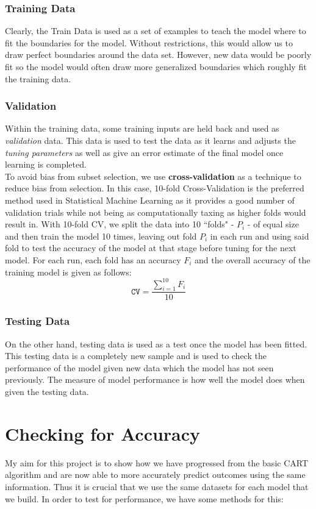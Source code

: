 \documentclass[11pt,a4paper]{report}
\begin{document}
\subsubsection{Training Data}
Clearly, the Train Data is used as a set of examples to teach the model where to fit the boundaries for the model. 
Without restrictions, this would allow us to draw perfect boundaries around the data set. However, new data would be poorly fit so the model would often draw more generalized boundaries which roughly fit the training data.
\subsubsection{Validation}
Within the training data, some training inputs are held back and used as \textit{validation} data.
This data is used to test the data as it learns and adjusts the \textit{tuning parameters} as well as give an error estimate of the final model once learning is completed.
\medskip\\
To avoid bias from subset selection, we use \textbf{cross-validation} as a technique to reduce bias from selection.
In this case, 10-fold Cross-Validation is the preferred method used in Statistical Machine Learning as it provides a good number of validation trials while not being as computationally taxing as higher folds would result in.
With 10-fold CV, we split the data into 10 ``folds" - $P_i$ - of equal size and then train the model 10 times, leaving out fold $P_i$ in each run and using said fold to test the accuracy of the model at that stage before tuning for the next model.
For each run, each fold has an accuracy $F_i$ and the overall accuracy of the training model is given as follows:
\[ 
\texttt{CV} = \frac{\sum_{i=1}^{10} F_i}{10} 
\]
\subsubsection{Testing Data}
On the other hand, testing data is used as a test once the model has been fitted.
This testing data is a completely new sample and is used to check the performance of the model given new data which the model has not seen previously. 
The measure of model performance is how well the model does when given the testing data. 

\section{Checking for Accuracy}
My aim for this project is to show how we have progressed from the basic CART algorithm and are now able to more accurately predict outcomes using the same information.
Thus it is crucial that we use the same datasets for each model that we build.
In order to test for performance, we have some methods for this:
\end{document}
